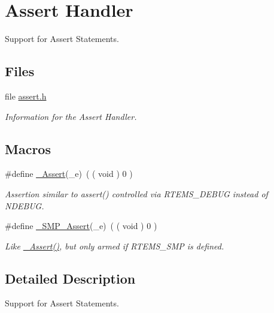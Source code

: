 \hypertarget{group__RTEMSScoreAssert}{}\section{Assert Handler}
\label{group__RTEMSScoreAssert}


Support for Assert Statements.  


\subsection*{Files}
\begin{DoxyCompactItemize}
\item 
file \mbox{\hyperlink{assert_8h}{assert.\+h}}
\begin{DoxyCompactList}\small\item\em Information for the Assert Handler. \end{DoxyCompactList}\end{DoxyCompactItemize}
\subsection*{Macros}
\begin{DoxyCompactItemize}
\item 
\mbox{\label{group__RTEMSScoreAssert_gab823f93fcbe2a4beb27633f7df422515}} 
\#define \mbox{\hyperlink{group__RTEMSScoreAssert_gab823f93fcbe2a4beb27633f7df422515}{\+\_\+\+Assert}}(\+\_\+e)~( ( void ) 0 )
\begin{DoxyCompactList}\small\item\em Assertion similar to assert() controlled via R\+T\+E\+M\+S\+\_\+\+D\+E\+B\+UG instead of N\+D\+E\+B\+UG. \end{DoxyCompactList}\item 
\mbox{\label{group__RTEMSScoreAssert_ga1771a5f667dc742acd2e193102251bb2}} 
\#define \mbox{\hyperlink{group__RTEMSScoreAssert_ga1771a5f667dc742acd2e193102251bb2}{\+\_\+\+S\+M\+P\+\_\+\+Assert}}(\+\_\+e)~( ( void ) 0 )
\begin{DoxyCompactList}\small\item\em Like \mbox{\hyperlink{group__RTEMSScoreAssert_gab823f93fcbe2a4beb27633f7df422515}{\+\_\+\+Assert()}}, but only armed if R\+T\+E\+M\+S\+\_\+\+S\+MP is defined. \end{DoxyCompactList}\end{DoxyCompactItemize}


\subsection{Detailed Description}
Support for Assert Statements. 

